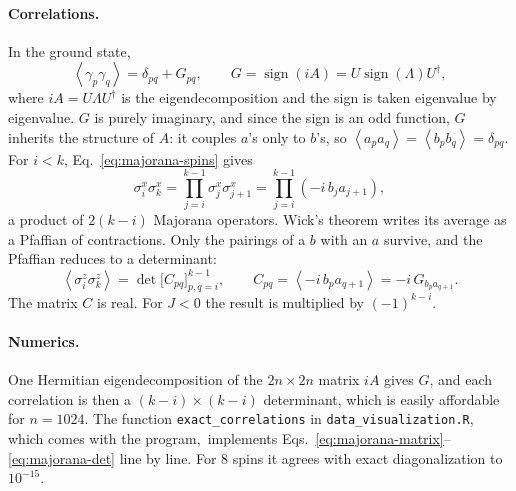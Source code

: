 \documentclass[aps,prb,preprint,amsmath,amssymb,nofootinbib,longbibliography]{revtex4-2}
\newcommand{\ev}[1]{\left\langle #1 \right\rangle}
\begin{document}
\paragraph*{Correlations.}
In the ground state,
\begin{equation}
  \ev{\gamma_p\gamma_q} = \delta_{pq} + G_{pq}, \qquad G = \operatorname{sign}(iA) = U\operatorname{sign}(\Lambda)U^\dagger,
  \label{eq:majorana-G}
\end{equation}
where $iA = U\Lambda U^\dagger$ is the eigendecomposition and the sign is taken eigenvalue by eigenvalue. $G$ is purely
imaginary, and since the sign is an odd function, $G$ inherits the structure of $A$: it couples $a$'s only to $b$'s,
so $\ev{a_pa_q} = \ev{b_pb_q} = \delta_{pq}$. For $i < k$, Eq.~\eqref{eq:majorana-spins} gives
\begin{equation}
  \sigma^x_i\sigma^x_k = \prod_{j=i}^{k-1}\sigma^x_j\sigma^x_{j+1} = \prod_{j=i}^{k-1}\left(-i\,b_j a_{j+1}\right),
\end{equation}
a product of $2(k-i)$ Majorana operators. Wick's theorem writes its average as a Pfaffian of contractions. Only the
pairings of a $b$ with an $a$ survive, and the Pfaffian reduces to a determinant:
\begin{equation}
  \ev{\sigma^z_i\sigma^z_k} = \det\big[C_{pq}\big]_{p,q = i}^{k-1}, \qquad C_{pq} = \ev{-i\,b_p a_{q+1}}
  = -i\,G_{b_p a_{q+1}} .
  \label{eq:majorana-det}
\end{equation}
The matrix $C$ is real. For $J < 0$ the result is multiplied by $(-1)^{k-i}$.

\paragraph*{Numerics.}
One Hermitian eigendecomposition of the $2n\times 2n$ matrix $iA$ gives $G$, and each correlation is then a
$(k-i)\times(k-i)$ determinant, which is easily affordable for $n = 1024$. The function \texttt{exact\_correlations}
in \texttt{data\_visualization.R}, which comes with the program,\codecite\ implements Eqs.~\eqref{eq:majorana-matrix}--\eqref{eq:majorana-det} line by line.
For 8 spins it agrees with exact diagonalization to $10^{-15}$.



\end{document}
